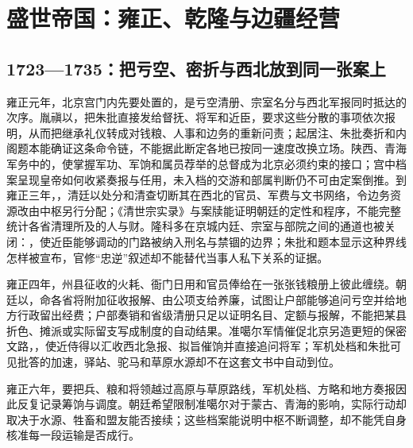 \chapter{盛世帝国：雍正、乾隆与边疆经营}
\label{ch:high-qing}



\section{1723—1735：把亏空、密折与西北放到同一张案上}

雍正元年，北京宫门内先要处置的，是亏空清册、宗室名分与西北军报同时抵达的次序。胤禛以，把朱批直接发给督抚、将军和近臣，要求这些分散的事项依次报明，从而把继承礼仪转成对钱粮、人事和边务的重新问责；起居注、朱批奏折和内阁题本能确证这条命令链，不能据此断定各地已按同一速度改换立场。陕西、青海军务中的，使掌握军功、军饷和属员荐举的总督成为北京必须约束的接口；宫中档案呈现皇帝如何收紧奏报与任用，未入档的交游和部属判断仍不可由定案倒推。到雍正三年，，清廷以处分和清查切断其在西北的官员、军费与文书网络，令边务资源改由中枢另行分配；《清世宗实录》与案牍能证明朝廷的定性和程序，不能完整统计各省清理所及的人与财。隆科多在京城内廷、宗室与部院之间的通道也被关闭：，使近臣能够调动的门路被纳入刑名与禁锢的边界；朱批和题本显示这种界线怎样被宣布，官修“忠逆”叙述却不能替代当事人私下关系的证据。

雍正四年，州县征收的火耗、衙门日用和官员俸给在一张张钱粮册上彼此缠绕。朝廷以，命各省将附加征收报解、由公项支给养廉，试图让户部能够追问亏空并给地方行政留出经费；户部奏销和省级清册只足以证明名目、定额与报解，不能把某县折色、摊派或实际留支写成制度的自动结果。准噶尔军情催促北京另造更短的保密文路，，使近侍得以汇收西北急报、拟旨催饷并直接追问将军；军机处档和朱批可见批答的加速，驿站、驼马和草原水源却不在这套文书中自动到位。

雍正六年，要把兵、粮和将领越过高原与草原路线，军机处档、方略和地方奏报因此反复记录筹饷与调度。朝廷希望限制准噶尔对于蒙古、青海的影响，实际行动却取决于水源、牲畜和盟友能否接续；这些档案能说明中枢不断调整，却不能凭自身核准每一段运输是否成行。

